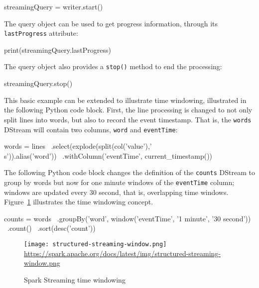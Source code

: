 \begin{pythoncode}
streamingQuery = writer.start()
\end{pythoncode}

The query object can be used to get progress information, through its \texttt{lastProgress} attribute:

\begin{pythoncode}
print(streamingQuery.lastProgress)
\end{pythoncode}

The query object also provides a \texttt{stop()} method to end the processing:

\begin{pythoncode}
streamingQuery.stop()
\end{pythoncode}

This basic example can be extended to illustrate time windowing, illustrated in the following Python code block. First, the line processing is changed to not only split lines into words, but also to record the event timestamp. That is, the \texttt{words} DStream will contain two columns, \texttt{word} and \texttt{eventTime}:

\begin{pythoncode}
words = lines \
    .select(explode(split(col('value'),'\\s')).alias('word')) \
    .withColumn('eventTime', current_timestamp())
\end{pythoncode}

The following Python code block changes the definition of the \texttt{counts} DStream to group by words but now for one minute windows of the \texttt{eventTime} column; windows are updated every 30 second, that is, overlapping time windows. Figure~\ref{fig:streamingtimewindow} illustrates the time windowing concept.

\begin{pythoncode}
counts = words \
    .groupBy('word', window('eventTime', '1 minute', '30 second')) \
    .count() \
    .sort(desc('count'))
\end{pythoncode}

\begin{figure}
\centering
\texttt{[image: structured-streaming-window.png]} \\

\scriptsize\url{https://spark.apache.org/docs/latest/img/structured-streaming-window.png}
\caption{Spark Streaming time windowing}
\label{fig:streamingtimewindow}
\end{figure}

